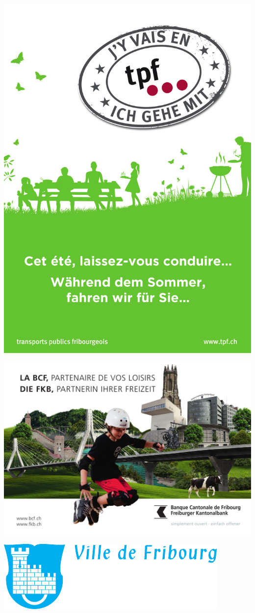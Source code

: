 {\centering
\includegraphics[width=\textwidth]{fig/tpf2.jpg}
\par
}
\clearpage
\thispagestyle{empty}%
{\centering
\includegraphics[width=\textwidth]{fig/bcf.jpg}
\par
\vspace*{20mm}
\vfill
\includegraphics[width=.8\textwidth]{fig/ville.pdf}
\vfill
\par
}
